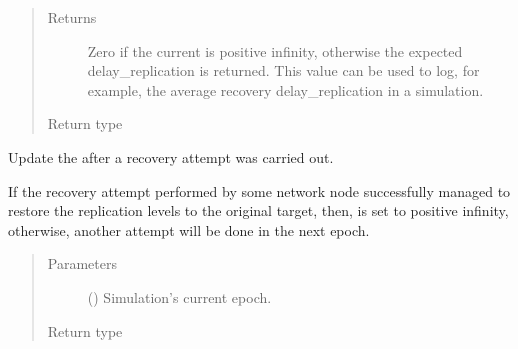 \documentclass[letterpaper,10pt,english]{sphinxmanual}
\begin{document}
\begin{fulllineitems}
\begin{fulllineitems}
\begin{quote}
\begin{description}
\item[{Returns}] \leavevmode
Zero if the current  is positive infinity,
otherwise the expected delay\_replication is returned. This value
can be used to log, for example, the average recovery
delay\_replication in a simulation.

\item[{Return type}] \leavevmode
{}

\end{description}\end{quote}

\end{fulllineitems}


\begin{fulllineitems}
\label{\detokenize{app.domain.helpers:app.domain.helpers.smart_dataclasses.FileBlockData.update_epochs_to_recover}}
Update the  after a recovery attempt was carried out.

If the recovery attempt performed by some network node successfully
managed to restore the replication levels to the original target, then,
 is set to positive infinity, otherwise, another
attempt will be done in the next epoch.
\begin{quote}\begin{description}
\item[{Parameters}] \leavevmode
{} () \textendash{} Simulation’s current epoch.

\item[{Return type}] \leavevmode
{}

\end{description}\end{quote}

\end{fulllineitems}


\end{fulllineitems}
\end{document}
